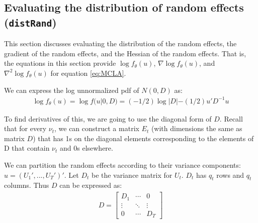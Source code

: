 \documentclass{article}
\begin{document}
%
%



\subsection{Evaluating the distribution of random effects (\texttt{distRand})}\label{sec:distRand}
This section discusses evaluating the distribution of the random effects, the gradient of the random effects, and the Hessian of the random effects. That is, the equations in this section provide  $\log f_\theta(u)$, $\nabla \log f_\theta(u)$, and $\nabla^2 \log f_\theta(u)$  for equation \ref{eq:MCLA}.

 We can  express the log unnormalized pdf of $N(0, D)$  as:
\begin{align}
\log f_\theta(u)= \log f (u| 0, D) = (-1/2) \log |D| - (1/2) u' D^{-1} u
\end{align}

 To find derivatives of this, we are going to use the diagonal form of $D$. Recall that for every $\nu_t$, we can construct a matrix $E_t$ (with dimensions the same as matrix $D$) that has 1s on the diagonal elements corresponding to the elements of D that contain $\nu_t$ and 0s  elsewhere.  

We can partition the random effects according to their variance components: $u=(U_1',...,U_T')'$.  Let $D_t$ be the variance matrix for $U_t$. $D_t$ has $q_t$ rows  and $q_t$ columns. Thus $D$ can be expressed as:
\begin{align}
D = \begin{bmatrix} D_1 & \cdots & 0 \\ \vdots & \ddots & \vdots \\ 0 & \cdots & D_T \end{bmatrix}
\end{align}
\end{document}
